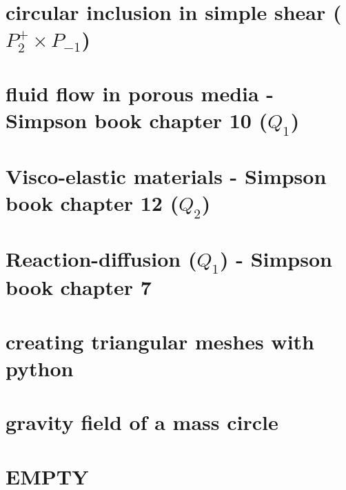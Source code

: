 \documentclass[a4paper,11pt]{report}
\begin{document}
\chapter{circular inclusion in simple shear ($P_2^+\times P_{-1}$)\label{f127}} %

\chapter{fluid flow in porous media - Simpson book chapter 10 ($Q_1$)\label{f128}} %

\chapter{Visco-elastic materials - Simpson book chapter 12 ($Q_2$)\label{f129}} %

\chapter{Reaction-diffusion ($Q_1$) - Simpson book chapter 7\label{f130}} %

\chapter{creating triangular meshes with python \label{f131}} %

\chapter{gravity field of a mass circle\label{f132}} %

\chapter{EMPTY \label{f133}} %
\end{document}
